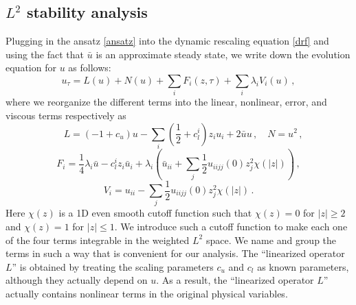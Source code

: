 \documentclass[12pt]{caltech_thesis}
\numberwithin{equation}{section}
\begin{document}
 
\subsection{$L^2$ stability analysis}


Plugging in the ansatz \eqref{ansatz} into the dynamic rescaling equation \eqref{drf} and using the fact that $\bar{u}$ is an approximate steady state, we write down the evolution equation for $u$ as follows:
\begin{equation*}
    {u}_\tau=L(u)+N(u)+\sum_i F_i(z, \tau)+ \sum_i \lambda_i V_i(u)\,,
\end{equation*}
where we reorganize the different terms into the linear, nonlinear, error, and viscous terms respectively as $$\quad L=(-1+{c_u}) {u}- \sum_i(\frac{1}{2}+{c_l^i})z_i {u}_{i}+2\bar{u}u\,,\quad N={u}^2\,,$$
$$ F_i=\frac{1}{4}\lambda_i\bar{u}-{c_l^i}z_i\bar{u}_i+\lambda_i (\bar{u}_{ii}+\sum_j\frac{1}{2}u_{iijj}(0)z_j^2\chi(|z|))\,,$$
$$ V_i={u}_{ii}-\sum_j\frac{1}{2}u_{iijj}(0)z_j^2\chi(|z|)\,.$$
Here $\chi(z)$ is a 1D even smooth cutoff function such that $\chi(z)=0$ for $|z|\geq 2$ and $\chi(z)=1$ for $|z|\leq 1$. We introduce such a cutoff function to make each one of the four terms integrable in the weighted $L^2$ space. We name and group the terms in such a way that is convenient for our analysis. The ``linearized operator $L$'' is obtained by treating the scaling parameters $c_u$ and $c_l$ as known parameters, although they actually depend on $u$. As a result, the ``linearized operator $L$'' actually contains nonlinear terms in the original physical variables.
\end{document}
